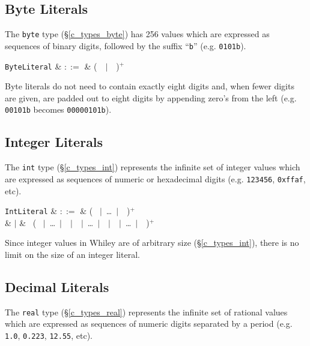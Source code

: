 \subsection{Byte Literals}

The \lstinline{byte} type (\S\ref{c_types_byte}) has 256 values which are expressed as sequences of binary digits, followed by the suffix ``\lstinline{b}'' (e.g. \lstinline{0101b}).


\begin{syntax}
 \verb+ByteLiteral+ & $::=$ & \big(\ \ $|$\ \ \big)$^+$\ \\
\end{syntax}


Byte literals do not need to contain exactly eight digits and, when fewer digits are given, are padded out to eight digits by appending zero's from the left (e.g. \lstinline{00101b} becomes \lstinline{00000101b}).


\subsection{Integer Literals}

The \lstinline{int} type (\S\ref{c_types_int}) represents the infinite set of integer values which are expressed as sequences of numeric or hexadecimal digits (e.g. \lstinline{123456}, \lstinline{0xffaf}, etc).

\begin{syntax}
  \verb+IntLiteral+ & $::=$ & \big( \ $|$\ \ldots\ $|$\ \ \big)$^+$ \\
  & $|$ &  \ \big( \ $|$\ \ldots\ $|$\ \ $|$\ \ $|$\ \ldots\ $|$\ \ $|$\ \ $|$\ \ldots\ $|$\ \ \big)$^+$\\
\end{syntax}

Since integer values in Whiley are of arbitrary size (\S\ref{c_types_int}), there is no limit on the size of an integer literal.

\subsection{Decimal Literals}

The \lstinline{real} type (\S\ref{c_types_real}) represents the infinite set of rational values which are expressed as sequences of numeric digits separated by a period (e.g. \lstinline{1.0}, \lstinline{0.223}, \lstinline{12.55}, etc).

